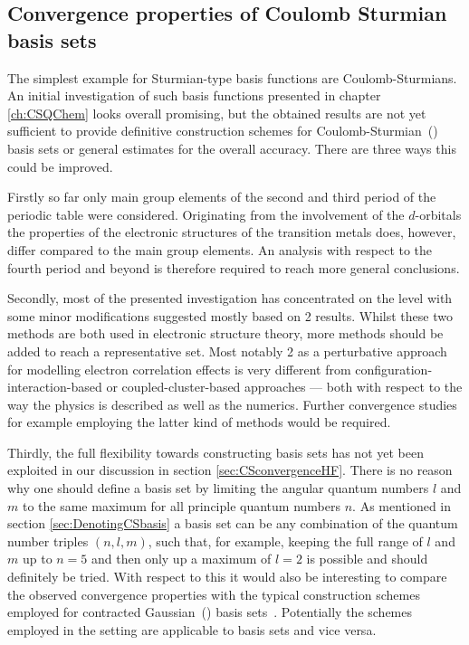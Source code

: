 \subsection{Convergence properties of Coulomb Sturmian basis sets}
The simplest example for Sturmian-type basis functions are Coulomb-Sturmians.
An initial investigation of such basis functions presented
in chapter \ref{ch:CSQChem} looks overall promising,
but the obtained results are not yet sufficient to provide definitive
construction schemes for Coulomb-Sturmian~(\CS) basis sets
or general estimates for the overall accuracy.
There are three ways this could be improved.

Firstly so far only main group elements of the second and third
period of the periodic table were considered.
Originating from the involvement of the $d$-orbitals
the properties of the electronic structures of the transition metals does, however,
differ compared to the main group elements.
An analysis with respect to the fourth period and beyond
is therefore required to reach more general conclusions.

Secondly, most of the presented investigation has concentrated on the \HF
level with some minor modifications suggested mostly based on {\MP}2 results.
Whilst these two methods are both used in electronic structure theory,
more methods should be added to reach a representative set.
Most notably {\MP}2 as a perturbative approach
for modelling electron correlation effects is very different from
configuration-interaction-based
or coupled-cluster-based approaches
--- both with respect to the way the physics is described
as well as the numerics.
Further convergence studies for example employing the latter kind of methods
would be required.

Thirdly, the full flexibility towards constructing \CS basis sets has not yet
been exploited in our discussion in section \vref{sec:CSconvergenceHF}.
There is no reason why one should define a basis set
by limiting the angular quantum numbers $l$ and $m$ to the same maximum for all
principle quantum numbers $n$.
As mentioned in section \vref{sec:DenotingCSbasis} a \CS basis set can be any
combination of the quantum number triples $(n, l, m)$,
such that, for example, keeping the full range of $l$ and $m$
up to $n=5$ and then only up a maximum of $l=2$ is possible
and should definitely be tried.
With respect to this it would also be interesting to compare the
observed convergence properties with the typical construction schemes
employed for contracted Gaussian~(\cGTO) basis sets~\cite{Jensen2013,Hill2013}.
Potentially the schemes employed in the \cGTO setting are applicable
to \CS basis sets and vice versa.

